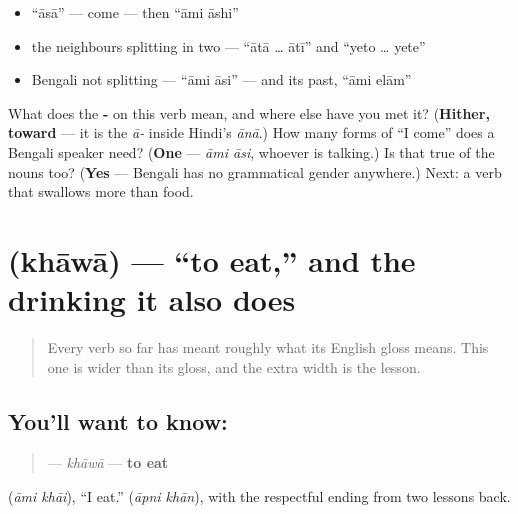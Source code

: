 \begin{itemize}
\raggedright
  \item \textquotedblleft{}āsā\textquotedblright{} — come — then \textquotedblleft{}āmi āshi\textquotedblright{}
  \item the neighbours splitting in two — \textquotedblleft{}ātā … ātī\textquotedblright{} and \textquotedblleft{}yeto … yete\textquotedblright{}
  \item Bengali not splitting — \textquotedblleft{}āmi āsi\textquotedblright{} — and its past, \textquotedblleft{}āmi elām\textquotedblright{}
\end{itemize}

\begin{tcolorbox}[breakable,colback=teal!4,colframe=teal!35!black,title={Before you move on}]
What does the \textbf{-} on this verb mean, and where else have you met it? (\textbf{Hither, toward} — it is the \emph{ā-} inside Hindi's \emph{ānā}.) How many forms of \textquotedblleft{}I come\textquotedblright{} does a Bengali speaker need? (\textbf{One} — \emph{āmi āsi}, whoever is talking.) Is that true of the nouns too? (\textbf{Yes} — Bengali has no grammatical gender anywhere.) Next: a verb that swallows more than food.
\end{tcolorbox}
\section[khāwā]{ (khāwā) — \textquotedblleft{}to eat,\textquotedblright{} and the drinking it also does}

\label{lesson:BN-C07-khaowa}



\begin{quote}
Every verb so far has meant roughly what its English gloss means. This one is wider than its gloss, and the extra width is the lesson.
\end{quote}

\subsection*{You'll want to know: }
\begin{quote}
\textbf{} — \emph{khāwā} — \textbf{to eat}
\end{quote}

  (\emph{āmi khāi}), \textquotedblleft{}I eat.\textquotedblright{}   (\emph{āpni khān}), with the respectful ending from two lessons back.

